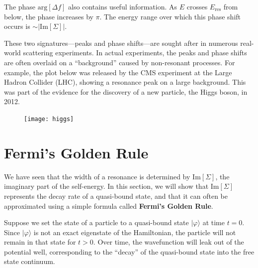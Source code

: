 \documentclass[pra,12pt]{revtex4}
\begin{document}
The phase $\mathrm{arg}[\Delta f]$ also contains useful information.
As $E$ crosses $E_{\mathrm{res}}$ from below, the phase increases by
$\pi$.  The energy range over which this phase shift occurs is $\sim
|\mathrm{Im}[\Sigma]|$.

These two signatures---peaks and phase shifts---are sought after in
numerous real-world scattering experiments.  In actual experiments,
the peaks and phase shifts are often overlaid on a ``background''
caused by non-resonant processes.  For example, the plot below was
released by the CMS experiment at the Large Hadron Collider (LHC),
showing a resonance peak on a large background.  This was part of the
evidence for the discovery of a new particle, the Higgs boson, in
2012.

\begin{figure}[h]
  \centering\texttt{[image: higgs]}
\end{figure}

\section{Fermi's Golden Rule}
\label{sec:goldenrule}

We have seen that the width of a resonance is determined by
$\mathrm{Im}[\Sigma]$, the imaginary part of the self-energy.  In this
section, we will show that $\mathrm{Im}[\Sigma]$ represents the decay
rate of a quasi-bound state, and that it can often be approximated
using a simple formula called \textbf{Fermi's Golden Rule}.

Suppose we set the state of a particle to a quasi-bound state
$|\varphi\rangle$ at time $t = 0$.  Since $|\varphi\rangle$ is not an
exact eigenstate of the Hamiltonian, the particle will not remain in
that state for $t > 0$.  Over time, the wavefunction will leak out of
the potential well, corresponding to the ``decay'' of the quasi-bound
state into the free state continuum.
\end{document}

